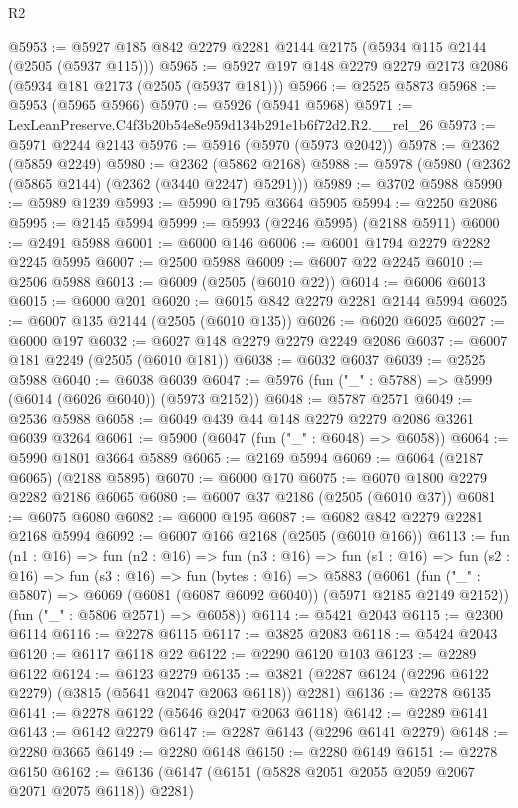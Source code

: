 \begin{lexlean}{R2}
\begin{coremodule}
@5953 := @5927 @185 @842 @2279 @2281 @2144 @2175 (@5934 @115 @2144 (@2505 (@5937 @115)))
@5965 := @5927 @197 @148 @2279 @2279 @2173 @2086 (@5934 @181 @2173 (@2505 (@5937 @181)))
@5966 := @2525 @5873
@5968 := @5953 (@5965 @5966)
@5970 := @5926 (@5941 @5968)
@5971 := LexLeanPreserve.C4f3b20b54e8e959d134b291e1b6f72d2.R2.__rel_26
@5973 := @5971 @2244 @2143
@5976 := @5916 (@5970 (@5973 @2042))
@5978 := @2362 (@5859 @2249)
@5980 := @2362 (@5862 @2168)
@5988 := @5978 (@5980 (@2362 (@5865 @2144) (@2362 (@3440 @2247) @5291)))
@5989 := @3702 @5988
@5990 := @5989 @1239
@5993 := @5990 @1795 @3664 @5905
@5994 := @2250 @2086
@5995 := @2145 @5994
@5999 := @5993 (@2246 @5995) (@2188 @5911)
@6000 := @2491 @5988
@6001 := @6000 @146
@6006 := @6001 @1794 @2279 @2282 @2245 @5995
@6007 := @2500 @5988
@6009 := @6007 @22 @2245
@6010 := @2506 @5988
@6013 := @6009 (@2505 (@6010 @22))
@6014 := @6006 @6013
@6015 := @6000 @201
@6020 := @6015 @842 @2279 @2281 @2144 @5994
@6025 := @6007 @135 @2144 (@2505 (@6010 @135))
@6026 := @6020 @6025
@6027 := @6000 @197
@6032 := @6027 @148 @2279 @2279 @2249 @2086
@6037 := @6007 @181 @2249 (@2505 (@6010 @181))
@6038 := @6032 @6037
@6039 := @2525 @5988
@6040 := @6038 @6039
@6047 := @5976 (fun ("_" : @5788) => @5999 (@6014 (@6026 @6040)) (@5973 @2152))
@6048 := @5787 @2571
@6049 := @2536 @5988
@6058 := @6049 @439 @44 @148 @2279 @2279 @2086 @3261 @6039 @3264
@6061 := @5900 (@6047 (fun ("_" : @6048) => @6058))
@6064 := @5990 @1801 @3664 @5889
@6065 := @2169 @5994
@6069 := @6064 (@2187 @6065) (@2188 @5895)
@6070 := @6000 @170
@6075 := @6070 @1800 @2279 @2282 @2186 @6065
@6080 := @6007 @37 @2186 (@2505 (@6010 @37))
@6081 := @6075 @6080
@6082 := @6000 @195
@6087 := @6082 @842 @2279 @2281 @2168 @5994
@6092 := @6007 @166 @2168 (@2505 (@6010 @166))
@6113 := fun (n1 : @16) =>
  fun (n2 : @16) =>
  fun (n3 : @16) =>
  fun (s1 : @16) =>
  fun (s2 : @16) =>
  fun (s3 : @16) =>
  fun (bytes : @16) =>
  @5883
    (@6061
      (fun ("_" : @5807) => @6069 (@6081 (@6087 @6092 @6040)) (@5971 @2185 @2149 @2152))
      (fun ("_" : @5806 @2571) => @6058))
@6114 := @5421 @2043
@6115 := @2300 @6114
@6116 := @2278 @6115
@6117 := @3825 @2083
@6118 := @5424 @2043
@6120 := @6117 @6118 @22
@6122 := @2290 @6120 @103
@6123 := @2289 @6122
@6124 := @6123 @2279
@6135 := @3821 (@2287 @6124 (@2296 @6122 @2279) (@3815 (@5641 @2047 @2063 @6118)) @2281)
@6136 := @2278 @6135
@6141 := @2278 @6122 (@5646 @2047 @2063 @6118)
@6142 := @2289 @6141
@6143 := @6142 @2279
@6147 := @2287 @6143 (@2296 @6141 @2279)
@6148 := @2280 @3665
@6149 := @2280 @6148
@6150 := @2280 @6149
@6151 := @2278 @6150
@6162 := @6136 (@6147 (@6151 (@5828 @2051 @2055 @2059 @2067 @2071 @2075 @6118)) @2281)

\end{coremodule}
\end{lexlean}
